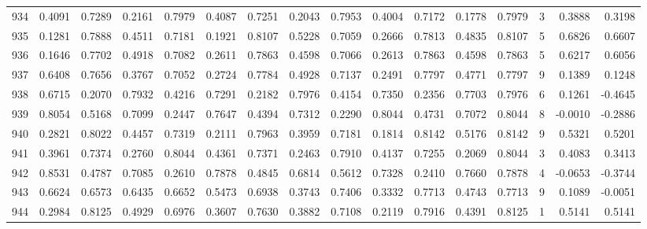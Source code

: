 \begin{tabular}{lrrrrrrrrrrrrrrr}
934 &      0.4091 &  0.7289 &  0.2161 &  0.7979 &  0.4087 &  0.7251 &  0.2043 &  0.7953 &  0.4004 &  0.7172 &   0.1778 &     0.7979 &      3 &                    0.3888 &                     0.3198 \\
935 &      0.1281 &  0.7888 &  0.4511 &  0.7181 &  0.1921 &  0.8107 &  0.5228 &  0.7059 &  0.2666 &  0.7813 &   0.4835 &     0.8107 &      5 &                    0.6826 &                     0.6607 \\
936 &      0.1646 &  0.7702 &  0.4918 &  0.7082 &  0.2611 &  0.7863 &  0.4598 &  0.7066 &  0.2613 &  0.7863 &   0.4598 &     0.7863 &      5 &                    0.6217 &                     0.6056 \\
937 &      0.6408 &  0.7656 &  0.3767 &  0.7052 &  0.2724 &  0.7784 &  0.4928 &  0.7137 &  0.2491 &  0.7797 &   0.4771 &     0.7797 &      9 &                    0.1389 &                     0.1248 \\
938 &      0.6715 &  0.2070 &  0.7932 &  0.4216 &  0.7291 &  0.2182 &  0.7976 &  0.4154 &  0.7350 &  0.2356 &   0.7703 &     0.7976 &      6 &                    0.1261 &                    -0.4645 \\
939 &      0.8054 &  0.5168 &  0.7099 &  0.2447 &  0.7647 &  0.4394 &  0.7312 &  0.2290 &  0.8044 &  0.4731 &   0.7072 &     0.8044 &      8 &                   -0.0010 &                    -0.2886 \\
940 &      0.2821 &  0.8022 &  0.4457 &  0.7319 &  0.2111 &  0.7963 &  0.3959 &  0.7181 &  0.1814 &  0.8142 &   0.5176 &     0.8142 &      9 &                    0.5321 &                     0.5201 \\
941 &      0.3961 &  0.7374 &  0.2760 &  0.8044 &  0.4361 &  0.7371 &  0.2463 &  0.7910 &  0.4137 &  0.7255 &   0.2069 &     0.8044 &      3 &                    0.4083 &                     0.3413 \\
942 &      0.8531 &  0.4787 &  0.7085 &  0.2610 &  0.7878 &  0.4845 &  0.6814 &  0.5612 &  0.7328 &  0.2410 &   0.7660 &     0.7878 &      4 &                   -0.0653 &                    -0.3744 \\
943 &      0.6624 &  0.6573 &  0.6435 &  0.6652 &  0.5473 &  0.6938 &  0.3743 &  0.7406 &  0.3332 &  0.7713 &   0.4743 &     0.7713 &      9 &                    0.1089 &                    -0.0051 \\
944 &      0.2984 &  0.8125 &  0.4929 &  0.6976 &  0.3607 &  0.7630 &  0.3882 &  0.7108 &  0.2119 &  0.7916 &   0.4391 &     0.8125 &      1 &                    0.5141 &                     0.5141 \\

\end{tabular}
